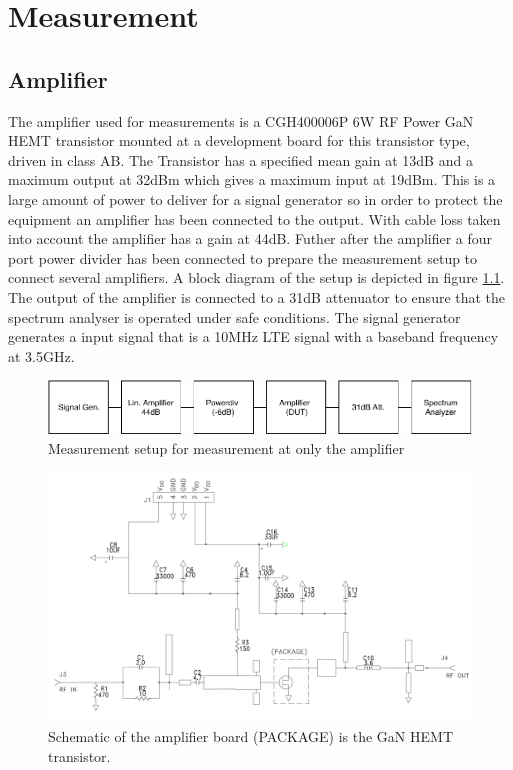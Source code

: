 \chapter{Measurement}\label{ch:measurement}


\section{Amplifier}

The amplifier used for measurements is a CGH400006P 6W RF Power GaN HEMT transistor mounted at a development board for this transistor type, driven in class AB. The Transistor has a specified mean gain at 13dB and a maximum output at 32dBm which gives a maximum input at 19dBm. This is a large amount of power to deliver for a signal generator so in order to protect the equipment an amplifier has been connected to the output. With cable loss taken into account the amplifier has a gain at 44dB. Futher after the amplifier a four port power divider has been connected to prepare the measurement setup to connect several amplifiers. A block diagram of the setup is depicted in figure \ref{fig:meas_amp}. The output of the amplifier is connected to a 31dB attenuator to ensure that the spectrum analyser is operated under safe conditions. The signal generator generates a input signal that is a 10MHz LTE signal with a baseband frequency at 3.5GHz.   


\begin{figure}[H]
\centering 
\includegraphics[scale = 0.9]{figures/measurement/cree/meas1/meas_set_1.pdf}
\caption{Measurement setup for measurement at only the amplifier }
\label{fig:meas_amp}
\end{figure}


\begin{figure}[H]
\centering 
\includegraphics[scale = 0.4]{figures/measurement/cree/cree_schematic.png}
\caption{Schematic of the amplifier board (PACKAGE) is the GaN HEMT transistor. \citep{cree2019}}
\label{fig:meas_amp_sch}
\end{figure}


